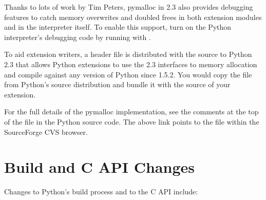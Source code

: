 \documentclass{howto}
\begin{document}
Thanks to lots of work by Tim Peters, pymalloc in 2.3 also provides
debugging features to catch memory overwrites and doubled frees in
both extension modules and in the interpreter itself.  To enable this
support, turn on the Python interpreter's debugging code by running
 with .

To aid extension writers, a header file  is
distributed with the source to Python 2.3 that allows Python
extensions to use the 2.3 interfaces to memory allocation and compile
against any version of Python since 1.5.2.  You would copy the file
from Python's source distribution and bundle it with the source of
your extension.

\begin{seealso}

{For the full details of the pymalloc implementation, see
the comments at the top of the file  in the
Python source code.  The above link points to the file within the
SourceForge CVS browser.}

\end{seealso}


\section{Build and C API Changes}

Changes to Python's build process and to the C API include:
\end{document}
